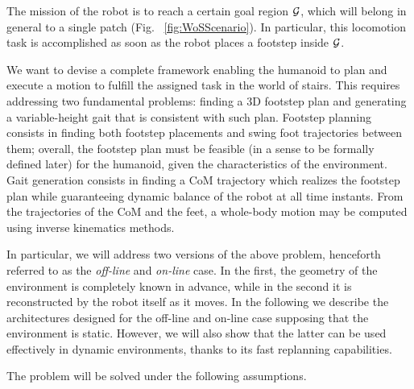 The mission of the robot is to reach a certain goal region $\cal G$, which will belong in general to a single patch (Fig.~ \ref{fig:WoSScenario}). In particular, this locomotion task is accomplished as soon as the robot places a footstep inside $\cal G$.

We want to devise a complete framework enabling the humanoid to plan and execute a motion to fulfill the assigned task in the world of stairs.
This requires addressing two fundamental problems: finding a 3D footstep plan and generating a variable-height gait that is consistent with such plan.
Footstep planning consists in finding both footstep placements and swing foot trajectories between them; overall, the footstep plan must be feasible (in a sense to be formally defined later) for the humanoid, given the characteristics of the environment. Gait generation consists in finding a CoM trajectory which realizes the footstep plan while guaranteeing dynamic balance of the robot at all time instants. From the trajectories of the CoM and the feet, a whole-body motion may be computed using inverse kinematics methods.

In particular, we will address two versions of the above problem, henceforth referred to as the \textit{off-line} and \textit{on-line} case. In the first, the geometry of the environment is completely known in advance, while in the second it is reconstructed by the robot itself as it moves. 
In the following we describe the architectures designed for the off-line and on-line case supposing that the environment is static.
However, we will also show that the latter can be used effectively in dynamic environments, thanks to its fast replanning capabilities. 

The problem will be solved under the following assumptions.

